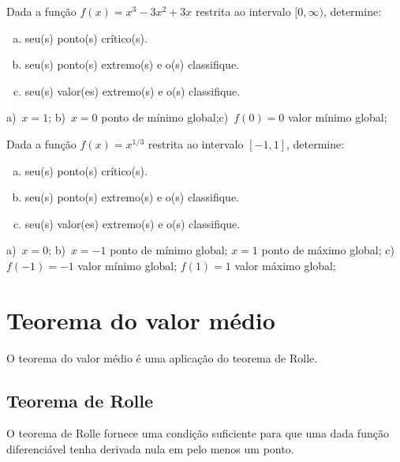 \begin{exer}
  Dada a função $f(x)=x^{3} - 3 x^{2} + 3 x$ restrita ao intervalo $[0, \infty)$, determine:
  \begin{enumerate}[a)]
  \item seu(s) ponto(s) crítico(s).
  \item seu(s) ponto(s) extremo(s) e o(s) classifique.
  \item seu(s) valor(es) extremo(s) e o(s) classifique.
  \end{enumerate}
\end{exer}
\begin{resp}
  a)~$x=1$; b)~$x=0$ ponto de mínimo global;c)~$f(0)=0$ valor mínimo global;
\end{resp}

\begin{exer}
  Dada a função $f(x)=x^{1/3}$ restrita ao intervalo $[-1,1]$, determine:
  \begin{enumerate}[a)]
  \item seu(s) ponto(s) crítico(s).
  \item seu(s) ponto(s) extremo(s) e o(s) classifique.
  \item seu(s) valor(es) extremo(s) e o(s) classifique.
  \end{enumerate}
\end{exer}
\begin{resp}
  a)~$x=0$; b)~$x=-1$ ponto de mínimo global; $x=1$ ponto de máximo global; c)~$f(-1)=-1$ valor mínimo global; $f(1)=1$ valor máximo global;
\end{resp}


\section{Teorema do valor médio}\label{cap_apderiv_sec_valormedio}

O teorema do valor médio é uma aplicação do teorema de Rolle.

\subsection{Teorema de Rolle}

O teorema de Rolle fornece uma condição suficiente para que uma dada função diferenciável tenha derivada nula em pelo menos um ponto.

